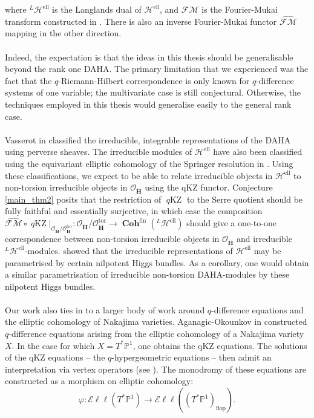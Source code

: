 \documentclass[a4paper]{report}
\theoremstyle{theorem}
\theoremstyle{definition}
\theoremstyle{remark}
\theoremstyle{proposition}
\theoremstyle{conjecture}
\theoremstyle{lemma}
\theoremstyle{corollary}
\theoremstyle{exercise}
\theoremstyle{example}
\newcommand{\mcal}{\mathcal}
\newcommand{\on}{\operatorname}
\newcommand{\coh}{\on{\mathbf{Coh}}}
\newcommand{\qKZ}{\on{\mathit{q}KZ}}
\begin{document}
  where ${}^L\mcal{H}^{\on{ell}}$ is the Langlands dual of $\mcal{H}^{\on{ell}}$, and $\mcal{FM}$ is the Fourier-Mukai transform constructed in \cite{LZZ23}.
  There is also an inverse Fourier-Mukai functor $\widehat{\mcal{FM}}$ mapping in the other direction. \\\\ 
  Indeed, the expectation is that the ideas in this thesis should be generalisable beyond the rank one 
  DAHA. The primary limitation that we experienced was the fact that the $q$-Riemann-Hilbert correspondence is 
  only known for $q$-difference systems of one variable; the multivariate case is still conjectural. 
  Otherwise, the techniques employed in this thesis would generalise easily to the general rank case. \\\\
  Vasserot in \cite{vas05} classified the irreducible, integrable representations of the DAHA using 
  perverse sheaves. The irreducible modules of $\mcal{H}^{\on{ell}}$ have also been classified using 
  the equivariant elliptic cohomology of the Springer resolution in \cite{ZZ21}. 
  Using these classifications, we expect to be able to relate irreducible objects in $\mcal{H}^{\on{ell}}$
  to non-torsion irreducible objects in $\mcal{O}_{\mathbf{\ddot{\mathbf{H}}}}$ using the qKZ functor. 
  Conjecture \ref{main_thm2} posits that the restriction of $\qKZ$ to the Serre quotient should be fully faithful 
  and essentially surjective, in which case the composition $\widehat{\mcal{FM}} \circ \qKZ\vert_{\mcal{O}_{\mathbf{\ddot{\mathbf{H}}}}/\mcal{O}_{\mathbf{\ddot{\mathbf{H}}}}^{\on{tor}}} : \mcal{O}_{\mathbf{\ddot{\mathbf{H}}}}/\mcal{O}_{\ddot{\mathbf{H}}}^{\on{tor}} \to \coh^{\on{fin}}({}^L\mcal{H}^{\on{ell}})$
  should give a one-to-one correspondence between non-torsion irreducible objects in $\mcal{O}_{\mathbf{\ddot{\mathbf{H}}}}$ 
  and irreducible ${}^L\mcal{H}^{\on{ell}}$-modules. \cite{ZZ21} showed that the irreducible representations of $\mcal{H}^{\on{ell}}$ 
  may be parametrised by certain nilpotent Higgs bundles. As a corollary, one would obtain a similar parametrisation of irreducible non-torsion 
  DAHA-modules by these nilpotent Higgs bundles.\\\\
  Our work also ties in to a larger body of work around $q$-difference equations and the elliptic cohomology of Nakajima varieties.
  Aganagic-Okounkov in \cite{ao16} constructed $q$-difference equations arising from the elliptic cohomology 
  of a Nakajima variety $X$. In the case for which $X = T^\ast\mathbb{P}^1$, one obtains the 
  qKZ equations. The solutions of the qKZ equations -- the $q$-hypergeometric equations -- then admit an interpretation via 
  vertex operators (see \cite[\S 6]{ao16}). The monodromy of these equations are constructed as a morphism on elliptic cohomology:
  $$\varphi : \mcal{E}\ell\ell (T^\ast\mathbb{P}^1) \longrightarrow \mcal{E}\ell\ell( (T^\ast\mathbb{P}^1)_{\on{flop}}).$$
  
\end{document}

